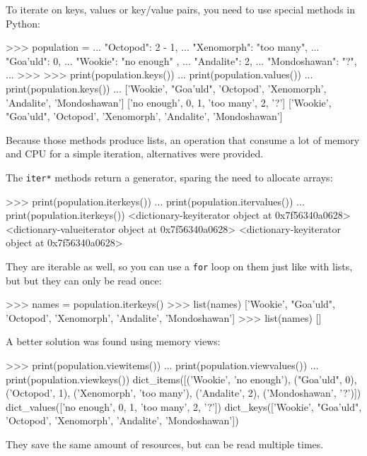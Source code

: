 To iterate on keys, values or key/value pairs, you need to use special methods in Python:

\begin{py2}
>>> population = {
...     "Octopod": 2 - 1,
...     "Xenomorph": "too many",
...     "Goa'uld": 0,
...     "Wookie": "no enough" ,
...     "Andalite": 2,
...     "Mondoshawan": "?",
... }
>>>
>>> print(population.keys())
... print(population.values())
... print(population.keys())
...
['Wookie', "Goa'uld", 'Octopod', 'Xenomorph', 'Andalite', 'Mondoshawan']
['no enough', 0, 1, 'too many', 2, '?']
['Wookie', "Goa'uld", 'Octopod', 'Xenomorph', 'Andalite', 'Mondoshawan']
\end{py2}

Because those methods produce lists, an operation that consume a lot of memory and CPU for a simple iteration, alternatives were provided.

The \lstinline{iter*} methods return a generator, sparing the need to allocate arrays:

\begin{py2}
>>> print(population.iterkeys())
... print(population.itervalues())
... print(population.iterkeys())
<dictionary-keyiterator object at 0x7f56340a0628>
<dictionary-valueiterator object at 0x7f56340a0628>
<dictionary-keyiterator object at 0x7f56340a0628>
\end{py2}

They are \gls{iterable} as well, so you can use a \lstinline{for} loop on them just like with lists, but but they can only be read once:

\begin{py2}
>>> names = population.iterkeys()
>>> list(names)
['Wookie', "Goa'uld", 'Octopod', 'Xenomorph', 'Andalite', 'Mondoshawan']
>>> list(names)
[]
\end{py2}

A better solution was found using memory views:

\begin{py2}
>>> print(population.viewitems())
... print(population.viewvalues())
... print(population.viewkeys())
dict_items([('Wookie', 'no enough'), ("Goa'uld", 0), ('Octopod', 1), ('Xenomorph', 'too many'), ('Andalite', 2), ('Mondoshawan', '?')])
dict_values(['no enough', 0, 1, 'too many', 2, '?'])
dict_keys(['Wookie', "Goa'uld", 'Octopod', 'Xenomorph', 'Andalite', 'Mondoshawan'])

\end{py2}

They save the same amount of resources, but can be read multiple times.

